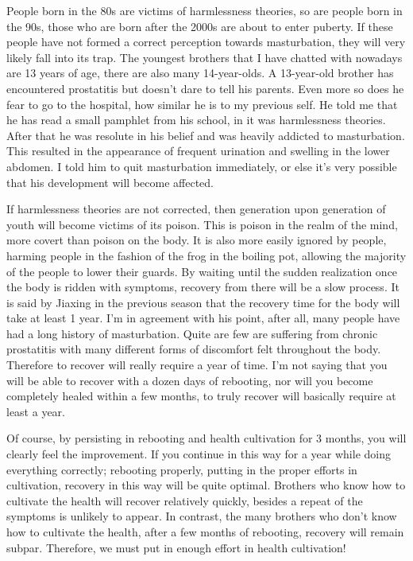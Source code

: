 \documentclass[
]{book}
\begin{document}
People born in the 80s are victims of harmlessness theories, so are people born in the 90s, those who are born after the 2000s are about to enter puberty. If these people have not formed a correct perception towards masturbation, they will very likely fall into its trap. The youngest brothers that I have chatted with nowadays are 13 years of age, there are also many 14-year-olds. A 13-year-old brother has encountered prostatitis but doesn't dare to tell his parents. Even more so does he fear to go to the hospital, how similar he is to my previous self. He told me that he has read a small pamphlet from his school, in it was harmlessness theories. After that he was resolute in his belief and was heavily addicted to masturbation. This resulted in the appearance of frequent urination and swelling in the lower abdomen. I told him to quit masturbation immediately, or else it's very possible that his development will become affected.

If harmlessness theories are not corrected, then generation upon generation of youth will become victims of its poison. This is poison in the realm of the mind, more covert than poison on the body. It is also more easily ignored by people, harming people in the fashion of the frog in the boiling pot, allowing the majority of the people to lower their guards. By waiting until the sudden realization once the body is ridden with symptoms, recovery from there will be a slow process. It is said by Jiaxing in the previous season that the recovery time for the body will take at least 1 year. I'm in agreement with his point, after all, many people have had a long history of masturbation. Quite are few are suffering from chronic prostatitis with many different forms of discomfort felt throughout the body. Therefore to recover will really require a year of time. I'm not saying that you will be able to recover with a dozen days of rebooting, nor will you become completely healed within a few months, to truly recover will basically require at least a year.

Of course, by persisting in rebooting and health cultivation for 3 months, you will clearly feel the improvement. If you continue in this way for a year while doing everything correctly; rebooting properly, putting in the proper efforts in cultivation, recovery in this way will be quite optimal. Brothers who know how to cultivate the health will recover relatively quickly, besides a repeat of the symptoms is unlikely to appear. In contrast, the many brothers who don't know how to cultivate the health, after a few months of rebooting, recovery will remain subpar. Therefore, we must put in enough effort in health cultivation!
\end{document}
